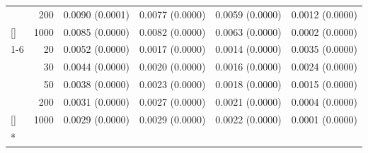 \documentclass[
  nonatbib,
  authoryear,
  preprint]{elsarticle}
\begin{document}
\begin{longtable}[t]{lrrrrr}
\nopagebreak
 & 200 & 0.0090 (0.0001) & 0.0077 (0.0000) & 0.0059 (0.0000) & 0.0012 (0.0000)\\
\nopagebreak
\multirow[t]{-4}{*}[\normalbaselineskip]{\raggedright\arraybackslash 20} & 1000 & 0.0085 (0.0000) & 0.0082 (0.0000) & 0.0063 (0.0000) & 0.0002 (0.0000)\\
\cmidrule{1-6}\pagebreak[0]
 & 20 & 0.0052 (0.0000) & 0.0017 (0.0000) & 0.0014 (0.0000) & 0.0035 (0.0000)\\
\nopagebreak
 & 30 & 0.0044 (0.0000) & 0.0020 (0.0000) & 0.0016 (0.0000) & 0.0024 (0.0000)\\
\nopagebreak
 & 50 & 0.0038 (0.0000) & 0.0023 (0.0000) & 0.0018 (0.0000) & 0.0015 (0.0000)\\
\nopagebreak
 & 200 & 0.0031 (0.0000) & 0.0027 (0.0000) & 0.0021 (0.0000) & 0.0004 (0.0000)\\
\nopagebreak
\multirow[t]{-4}{*}[\normalbaselineskip]{\raggedright\arraybackslash 40} & 1000 & 0.0029 (0.0000) & 0.0029 (0.0000) & 0.0022 (0.0000) & 0.0001 (0.0000)\\*

\end{longtable}

\endgroup{}

\clearpage

\begingroup\fontsize{8}{10}\selectfont
\end{document}

